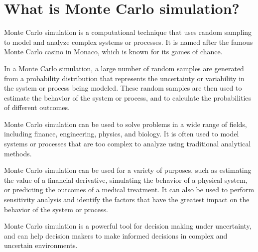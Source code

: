 \section{What is Monte Carlo simulation?}
Monte Carlo simulation is a computational technique that uses random sampling to model and analyze complex systems or processes. It is named after the famous Monte Carlo casino in Monaco, which is known for its games of chance.

In a Monte Carlo simulation, a large number of random samples are generated from a probability distribution that represents the uncertainty or variability in the system or process being modeled. These random samples are then used to estimate the behavior of the system or process, and to calculate the probabilities of different outcomes.

Monte Carlo simulation can be used to solve problems in a wide range of fields, including finance, engineering, physics, and biology. It is often used to model systems or processes that are too complex to analyze using traditional analytical methods.

Monte Carlo simulation can be used for a variety of purposes, such as estimating the value of a financial derivative, simulating the behavior of a physical system, or predicting the outcomes of a medical treatment. It can also be used to perform sensitivity analysis and identify the factors that have the greatest impact on the behavior of the system or process.

Monte Carlo simulation is a powerful tool for decision making under uncertainty, and can help decision makers to make informed decisions in complex and uncertain environments.

